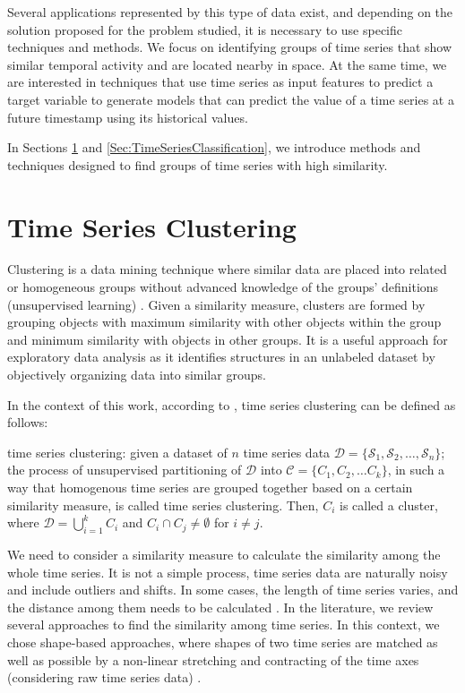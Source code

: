 Several applications represented by this type of data exist, and depending on the solution proposed for the problem studied, it is necessary to use specific techniques and methods. We focus on identifying groups of time series that show similar temporal activity and are located nearby in space. At the same time, we are interested in techniques that use time series as input features to predict a target variable to generate models that can predict the value of a time series at a future timestamp using its historical values.

In Sections \ref{Sec:TimeSeriesClustering} and \ref{Sec:TimeSeriesClassification}, we introduce methods and techniques designed to find groups of time series with high similarity. 

\section{Time Series Clustering}
\label{Sec:TimeSeriesClustering}

Clustering is a data mining technique where similar data are placed into related or homogeneous groups without advanced knowledge of the groups' definitions (unsupervised learning) \cite{HastieTF2009}. Given a similarity measure, clusters are formed by grouping objects with maximum similarity with other objects within the group and minimum similarity with objects in other groups. It is a useful approach for exploratory data analysis as it identifies structures in an unlabeled dataset by objectively organizing data into similar groups.

In the context of this work, according to \cite{Aghabozorgi2015}, time series clustering can be defined as follows:

\begin{definition} time series clustering: given a dataset of $n$ time series data $\mathcal{D} = \{\mathcal{S}_1, \mathcal{S}_2, \ldots, \mathcal{S}_n\}$; the process of unsupervised partitioning of $\mathcal{D}$ into $\mathcal{C} = \{C_1, C_2, \ldots C_k\}$, in such a way
that homogenous time series are grouped together based on a certain similarity measure, is called time series clustering. Then, $C_i$ is called a cluster, where $\mathcal{D} = \bigcup_{i=1}^{k} C_{i}$ and $C_i \cap C_j \neq \emptyset$ for $i \neq j$.
\end{definition}

We need to consider a similarity measure to calculate the similarity among the whole time series. It is not a simple process, time series data are naturally noisy and include outliers and shifts. In some cases, the length of time series varies, and the distance among them needs to be calculated \cite{Liao2005}. In the literature, we review several approaches to find the similarity among time series. In this context, we chose shape-based approaches, where shapes of two time series are matched as well as possible by a non-linear stretching and contracting of the time axes (considering raw time series data) \cite{Meesrikamolkul2012}.


